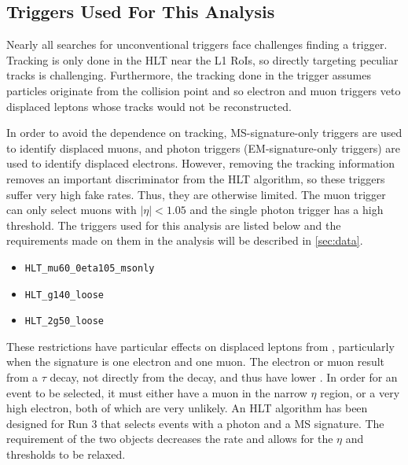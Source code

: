 \subsection{Triggers Used For This Analysis}

Nearly all searches for unconventional triggers face challenges finding a trigger. Tracking is only done in the \ac{HLT} near the \ac{L1} \acp{RoI}, so directly targeting peculiar tracks is challenging. Furthermore, the tracking done in the trigger assumes particles originate from the collision point and so electron and muon triggers veto displaced leptons whose tracks would not be reconstructed.

In order to avoid the dependence on tracking, \ac{MS}-signature-only triggers are used to identify displaced muons, and photon triggers (\ac{EM}-signature-only triggers) are used to identify displaced electrons. However, removing the tracking information removes an important discriminator from the \ac{HLT} algorithm, so these triggers suffer very high fake rates. Thus, they are otherwise limited. The muon trigger can only select muons with $|\eta| < 1.05$ and the single photon trigger has a high \pt threshold. The triggers used for this analysis are listed below and the requirements made on them in the analysis will be described in \autoref{sec:data}.

\begin{itemize}
	\item \texttt{HLT\_mu60\_0eta105\_msonly}
	\item \texttt{HLT\_g140\_loose}
	\item \texttt{HLT\_2g50\_loose}
\end{itemize}


These restrictions have particular effects on displaced leptons from \stau, particularly when the signature is one electron and one muon. The electron or muon result from a $\tau$ decay, not directly from the \stau decay, and thus have lower \pt. In order for an event to be selected, it must either have a muon in the narrow $\eta$ region, or a very high \pt electron, both of which are very unlikely. An \ac{HLT} algorithm has been designed for Run 3 that selects events with a photon and a \ac{MS} signature. The requirement of the two objects decreases the rate and allows for the $\eta$ and \pt thresholds to be relaxed. 



